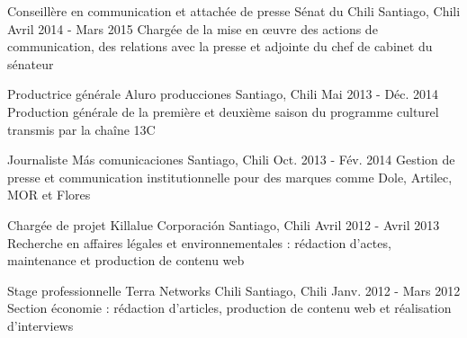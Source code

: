 \documentclass[11pt, a4paper]{awesome-cv}
\newcommand{\Myhref}[2]{\href{#1}{\color{darkblue}{#2}}}					%
\begin{document}
\begin{cventries}
  \cventry   								%
    {Conseillère en communication et attachée de presse}				%
    {Sénat du Chili}							%
    {Santiago, Chili}							%
    {Avril 2014 - Mars 2015} 						%
    {Chargée de la mise en œuvre  des actions de communication, des relations avec la presse et adjointe du chef de cabinet du sénateur \Myhref{http://harboesenador.cl/}{Felipe Harboe}}		%

    
  \cventry   								%
    {Productrice générale}						%
    {Aluro producciones}						%
    {Santiago, Chili}							%
    {Mai 2013 - Déc. 2014} 						%
    {									%
        Production générale de la première 
        et deuxième saison du programme culturel 
        \Myhref{http://www.13.cl/c/programas/la-bicicleta}{La Bicicleta} transmis par la chaîne 13C 
    }	
    
  
  
  
  
  \cventry   								%
    {Journaliste}							%
    {M\'as comunicaciones}						%
    {Santiago, Chili}							%
    {Oct. 2013 - Fév. 2014} 						%
    {Gestion de presse et communication institutionnelle pour des marques comme Dole, Artilec, MOR et Flores}%
    
   
   \cventry   								%
    {Chargée de projet}							%
    {Killalue Corporaci\'on}						%
    {Santiago, Chili}							%
    {Avril 2012 - Avril 2013} 						%
    {Recherche en affaires légales et environnementales :		%
  rédaction d'actes, maintenance et production de contenu web}
    
    
   \cventry   								%
    {Stage professionnelle}						%
    {Terra Networks Chili}						%
    {Santiago, Chili}							%
    {Janv. 2012 - Mars 2012} 						%
    {Section économie : rédaction d’articles, production de contenu web et réalisation d'interviews	                                                        %
  }    
    
\end{cventries}								%
\end{document}

